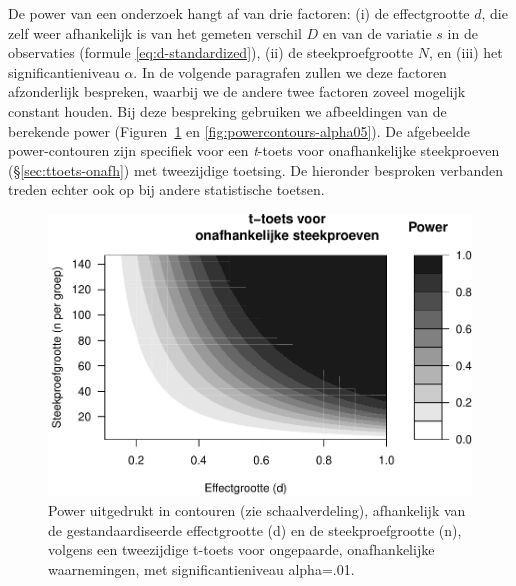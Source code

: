 \documentclass[
]{book}
\begin{document}
De power van een onderzoek hangt af van drie factoren: (i) de
effectgrootte \(d\), die zelf weer afhankelijk is van het gemeten verschil
\(D\) en van de variatie \(s\) in de observaties
(formule \eqref{eq:d-standardized}), (ii) de steekproefgrootte \(N\), en (iii)
het significantieniveau \(\alpha\). In de volgende paragrafen zullen we
deze factoren afzonderlijk bespreken, waarbij we de andere twee factoren
zoveel mogelijk constant houden. Bij deze bespreking gebruiken we
afbeeldingen van de berekende power
(Figuren~\ref{fig:powercontours-alpha01} en
\ref{fig:powercontours-alpha05}). De afgebeelde power-contouren
zijn specifiek voor een \emph{t}-toets voor onafhankelijke steekproeven
(§\ref{sec:ttoets-onafh}) met tweezijdige toetsing. De hieronder
besproken verbanden treden echter ook op bij andere statistische
toetsen.

\begin{figure}
\centering
\includegraphics{KMS-NL_files/figure-latex/powercontours-alpha01-1.pdf}
\caption{\label{fig:powercontours-alpha01}Power uitgedrukt in contouren (zie schaalverdeling), afhankelijk van de gestandaardiseerde effectgrootte (d) en de steekproefgrootte (n), volgens een tweezijdige t-toets voor ongepaarde, onafhankelijke waarnemingen, met significantieniveau alpha=.01.}
\end{figure}
\end{document}
